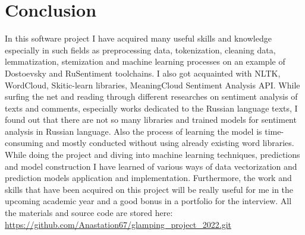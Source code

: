\documentclass{article}
\begin{document}
\section{Conclusion}
In this software project I have acquired many useful skills and knowledge especially in such fields as preprocessing data, tokenization, cleaning data, lemmatization, stemization and machine learning processes on an example of Dostoevsky and RuSentiment toolchains. I also got acquainted with NLTK, WordCloud, Skitic-learn libraries, MeaningCloud Sentiment Analysis API. While surfing the net\cite{carreon2021relation} and reading through different researches on sentiment analysis of texts and comments, especially works dedicated to the Russian language texts, I found out that there are not so many libraries and trained models for sentiment analysis in Russian language. Also the process of learning the model is time-consuming and mostly conducted without using already existing word libraries. While doing the project and diving into machine learning techniques, predictions and model construction I have learned of various ways of data vectorization and prediction models application and implementation. Furthermore, the work and skills that have been acquired on this project will be really useful for me in the upcoming academic year and a good bonus in a portfolio for the interview.
\newline\newline
All the materials and source code are stored here: \url{https://github.com/Anastation67/glamping_project_2022.git}

\newpage

\clearpage
\renewcommand*\contentsname{Table of contents}


\end{document}
